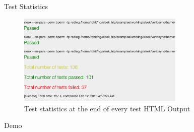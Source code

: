 \begin{frame}{Test Statistics}
\begin{figure}[H]
  \centering
    \includegraphics[width=300px]{figures/web_output_2.png}
  \caption{Test statistics at the end of every test HTML Output}
\end{figure}
\end{frame}

\begin{frame}

Demo

\end{frame}